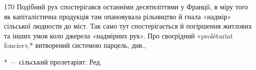 170 Подібний рух спостерігався останніми десятиліттями у Франції,
в міру того як капіталістична продукція там опановувала рільництво й
гнала «надмір» сільської людности до міст. Так само тут спостерігається
й погіршення житлових та інших умов коло джерела «надмірних рук».
Про своєрідний «prolétariat foncier»,* витворений системою парцель, див.,

* — сільський пролетаріят. Ред.
